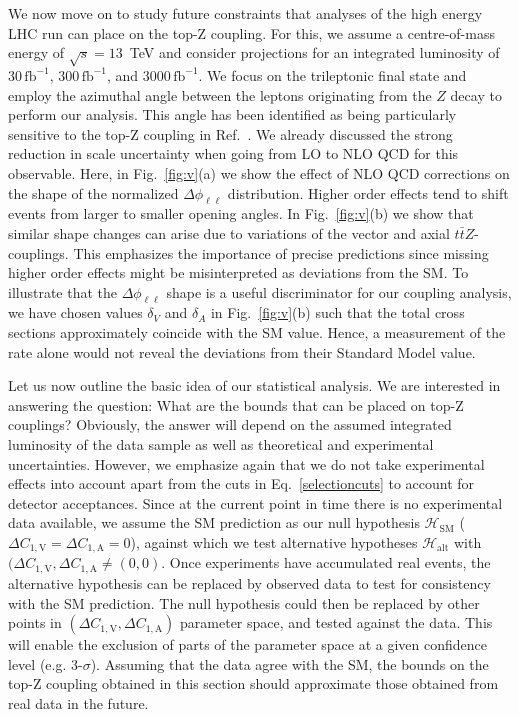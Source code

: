 \documentclass[preprint]{JHEP3} %
\def\ttbZ{t\bar{t}Z}
\def\invfb {\mathrm{fb}^{-1}}
\def\DConeA{\Delta C_{1,\mathrm{A}}}
\def\DConeV{\Delta C_{1,\mathrm{V}}}
\def\Halt{\mathcal{H}_{\mathrm{alt}}}
\begin{document}
We now move on to study future constraints that analyses of the high energy LHC run can place on the top-Z coupling.
For this, we assume a centre-of-mass energy of $\sqrt{s}=13$~TeV and consider projections for an integrated luminosity of
$30\, \invfb$, $300\, \invfb$, and $3000\, \invfb$. 
We focus on the trileptonic final state and employ the azimuthal angle between the leptons originating
from the $Z$ decay to perform our analysis.
This angle has been identified as being particularly sensitive to the top-Z coupling in Ref.~\cite{baur}.
We already discussed the strong reduction in scale uncertainty when going from LO to NLO QCD for this observable.
Here, in Fig.~\ref{fig:v}(a) we show the effect of NLO QCD corrections on the shape of the normalized $\Delta \phi_{\ell\ell}$ distribution.
Higher order effects tend to shift events from larger to smaller opening angles.
In Fig.~\ref{fig:v}(b) we show that similar shape changes can arise due to variations of the vector and axial $\ttbZ$-couplings.
This emphasizes the importance of precise predictions since missing higher order effects might be misinterpreted as deviations from the SM.
To illustrate that the $\Delta \phi_{\ell\ell}$ shape is a useful discriminator for our coupling analysis, we have chosen 
values $\delta_V$ and $\delta_A$ in Fig.~\ref{fig:v}(b) such that the total cross sections approximately coincide with the SM value.
Hence, a measurement of the rate alone would not reveal the deviations from their Standard Model value.
 



Let us now outline the basic idea of our statistical analysis.
We are interested in answering the question: What are the bounds that can be placed on top-Z couplings? 
Obviously, the answer will depend on the assumed integrated luminosity of the data sample as well as theoretical and experimental uncertainties. 
However, we emphasize again that we do not take experimental effects into account apart from the cuts in Eq.~\ref{selectioncuts} to account for detector acceptances.
Since at the current point in time there is no experimental data available, we assume the SM prediction as our null hypothesis $\mathcal{H}_{\mathrm{SM}}$ ($\DConeV=\DConeA=0$),
against which we test alternative hypotheses $\Halt$ with $(\DConeV,\DConeA \ne (0,0)$.
Once experiments have accumulated real events, the alternative hypothesis can be replaced by observed data to test for consistency with the SM prediction. 
The null hypothesis could then be replaced by  other points in $(\DConeV,\DConeA)$ parameter space, and tested against the data. 
This will enable the exclusion of parts of the parameter space at a given confidence level (e.g. 3-$\sigma$). 
Assuming that the data agree with the SM, 
the bounds on the top-Z coupling 
obtained in this section should approximate those obtained from real data in the future. 
\end{document}
